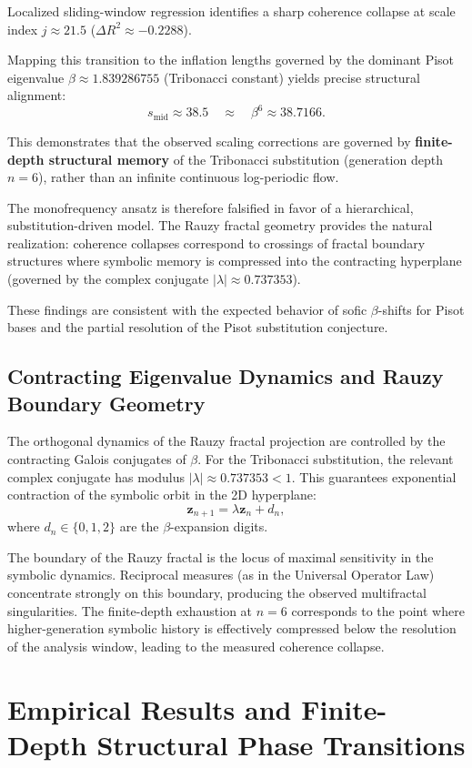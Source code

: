 Localized sliding-window regression identifies a sharp coherence collapse at scale index \(j \approx 21.5\) (\(\Delta R^2 \approx -0.2288\)).

Mapping this transition to the inflation lengths governed by the dominant Pisot eigenvalue \(\beta \approx 1.839286755\) (Tribonacci constant) yields precise structural alignment:
\[
s_{\text{mid}} \approx 38.5 \quad \approx \quad \beta^{6} \approx 38.7166.
\]

This demonstrates that the observed scaling corrections are governed by \textbf{finite-depth structural memory} of the Tribonacci substitution (generation depth \(n=6\)), rather than an infinite continuous log-periodic flow.

The monofrequency ansatz is therefore falsified in favor of a hierarchical, substitution-driven model. The Rauzy fractal geometry provides the natural realization: coherence collapses correspond to crossings of fractal boundary structures where symbolic memory is compressed into the contracting hyperplane (governed by the complex conjugate \(|\lambda| \approx 0.737353\)).

These findings are consistent with the expected behavior of sofic \(\beta\)-shifts for Pisot bases and the partial resolution of the Pisot substitution conjecture.

\subsection{Contracting Eigenvalue Dynamics and Rauzy Boundary Geometry}
The orthogonal dynamics of the Rauzy fractal projection are controlled by the contracting Galois conjugates of \(\beta\). For the Tribonacci substitution, the relevant complex conjugate has modulus \(|\lambda| \approx 0.737353 < 1\). This guarantees exponential contraction of the symbolic orbit in the 2D hyperplane:
\[
\mathbf{z}_{n+1} = \lambda \mathbf{z}_n + d_n,
\]
where \(d_n \in \{0,1,2\}\) are the \(\beta\)-expansion digits.

The boundary of the Rauzy fractal is the locus of maximal sensitivity in the symbolic dynamics. Reciprocal measures (as in the Universal Operator Law) concentrate strongly on this boundary, producing the observed multifractal singularities. The finite-depth exhaustion at \(n=6\) corresponds to the point where higher-generation symbolic history is effectively compressed below the resolution of the analysis window, leading to the measured coherence collapse.

\section{Empirical Results and Finite-Depth Structural Phase Transitions}

